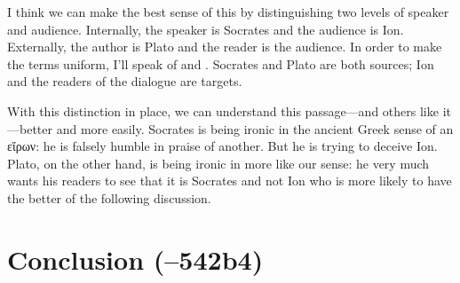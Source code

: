 \documentclass[11pt]{article}
\begin{document}
I think we can make the best sense of this by distinguishing two levels of
speaker and audience.  Internally, the speaker is Socrates and the audience
is Ion.  Externally, the author is Plato and the reader is the audience.
In order to make the terms uniform, I'll speak of  and
.  Socrates and Plato are both sources; Ion and the readers of
the dialogue are targets.

With this distinction in place, we can understand this passage---and others
like it---better and more easily.  Socrates is being ironic in the ancient
Greek sense of an εἴρων: he is falsely humble in praise of another.  But he
is trying to deceive Ion.  Plato, on the other hand, is being ironic in
more like our sense: he very much wants his readers to see that it is
Socrates and not Ion who is more likely to have the better of the following
discussion.


\section{Conclusion (--542b4)}


\newpage


\end{document}
